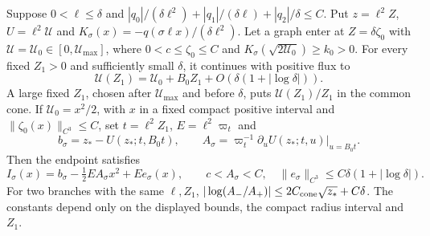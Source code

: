 \begin{lemma}
\label{lem:direct-small-height-continuation}
Suppose \(0<\ell\le\delta\) and
\(|q_0|/(\delta\ell^2)+|q_1|/(\delta\ell)+|q_2|/\delta\le C\).
Put \(z=\ell^2Z\), \(U=\ell^2\mathcal U\) and
\(K_\sigma(x)=-q(\sigma\ell x)/(\delta\ell^2)\). Let a graph enter at
\(Z=\delta\zeta_0\) with \(\mathcal U=\mathcal U_0\in[0,\mathcal U_{\max}]\), where
\(0<c\le\zeta_0\le C\) and \(K_\sigma(\sqrt{2\mathcal U_0})\ge k_0>0\).
For every fixed \(Z_1>0\) and sufficiently small \(\delta\), it continues
with positive flux to
\[
 \mathcal U(Z_1)=\mathcal U_0+B_0Z_1+O(\delta(1+|\log\delta|)).
\]
A large fixed \(Z_1\), chosen after \(\mathcal U_{\max}\) and before \(\delta\),
puts \(\mathcal U(Z_1)/Z_1\) in the common cone.
If \(\mathcal U_0=x^2/2\), with \(x\) in a fixed compact positive interval and
\(\|\zeta_0(x)\|_{C^3}\le C\), set
\(t=\ell^2Z_1\), \(E=\ell^2\varpi_t\) and
\[
 b_\sigma=z_*-U(z_*;t,B_0t),\qquad
 A_\sigma=\varpi_t^{-1}
       \left.\partial_uU(z_*;t,u)\right|_{u=B_0t}.
\]
Then the endpoint satisfies
\begin{equation}
\label{eq:direct-small-height-endpoint}
 I_\sigma(x)=b_\sigma-\tfrac12EA_\sigma x^2+Ee_\sigma(x),\qquad
 c<A_\sigma<C,\quad
 \|e_\sigma\|_{C^3}\le C\delta(1+|\log\delta|).
\end{equation}
For two branches with the same \(\ell,Z_1\),
\(|\log(A_-/A_+)|\le2C_{\rm cone}\sqrt{z_*}+C\delta\).
The constants depend only on the displayed bounds, the compact radius
interval and \(Z_1\).
\end{lemma}

